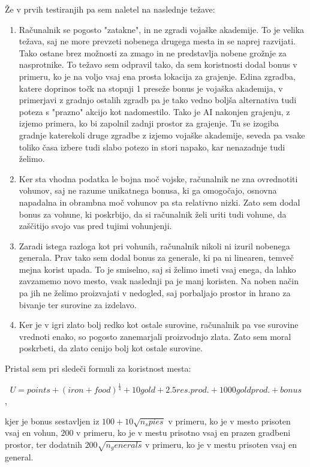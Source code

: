\documentclass[a4paper, 16pt]{article}
\begin{document}
Že v prvih testiranjih pa sem naletel na naslednje težave:

\begin{enumerate}
    \item Računalnik se pogosto "zatakne", in ne zgradi vojaške akademije. To je velika težava, saj ne more prevzeti nobenega drugega mesta 
        in se naprej razvijati. Tako ostane brez možnosti za zmago in ne predstavlja nobene grožnje za nasprotnike. To težavo sem odpravil tako, da sem 
        koristnosti dodal bonus v primeru, ko je na voljo vsaj ena prosta lokacija za grajenje. Edina zgradba, katere doprinos točk na stopnji 1 preseže bonus 
        je vojaška akademija, v primerjavi z gradnjo ostalih zgradb pa je tako vedno boljša alternativa tudi poteza s "prazno" akcijo kot nadomestilo. Tako je 
        AI nakonjen grajenju, z izjemo primera, ko bi zapolnil zadnji prostor za grajenje. Tu se izogiba gradnje katerekoli druge zgradbe z izjemo vojaške akademije,
        seveda pa vsake toliko časa izbere tudi slabo potezo in stori napako, kar nenazadnje tudi želimo.
    \item Ker sta vhodna podatka le bojna moč vojske, računalnik ne zna ovrednotiti vohunov, saj ne razume unikatnega bonusa, ki ga omogočajo, osnovna napadalna in obrambna moč vohunov pa sta relativno nizki. Zato sem dodal bonus 
        za vohune, ki poskrbijo, da si računalnik želi uriti tudi vohune, da zaščitijo svojo vas pred tujimi vohunjenji.
    \item Zaradi istega razloga kot pri vohunih, računalnik nikoli ni izuril nobenega generala. Prav tako sem dodal bonus za generale, ki pa ni linearen, temveč mejna korist upada. 
        To je smiselno, saj si želimo imeti vsaj enega, da lahko zavzamemo novo mesto, vsak naslednji pa je manj koristen. Na noben način pa jih ne želimo proizvajati v nedogled, saj porbaljajo 
        prostor in hrano za bivanje ter surovine za izdelavo.
    \item Ker je v igri zlato bolj redko kot ostale surovine, računalnik pa vse surovine vrednoti enako, so pogosto zanemarjali proizvodnjo zlata. Zato sem moral poskrbeti, da zlato cenijo bolj kot ostale surovine.    
\end{enumerate}

Pristal sem pri sledeči formuli za koristnost mesta:

$$ U = points + (iron + food)^\frac{1}{4} + 10gold + 2.5res. prod. + 1000gold prod. + bonus$$, 

kjer je bonus sestavljen iz $100 + 10\sqrt{n_spies}$ v primeru, ko je v mesto prisoten vsaj en vohun, $200$ v primeru, ko je v mestu prisotno vsaj en prazen gradbeni prostor, ter dodatnih 
$200 \sqrt{n_generals}$ v primeru, ko je v mestu prisoten vsaj en general.
\end{document}

